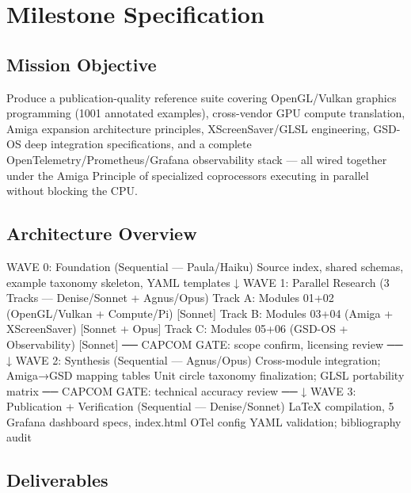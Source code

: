 \documentclass[11pt,letterpaper]{article}
\newcommand{\stageheader}[2]{%
  \noindent\colorbox{#2}{\makebox[\textwidth][l]{%
    \textcolor{white}{\bfseries\sffamily\hspace{6pt}#1\hspace{6pt}}}}%
  \vspace{0.5em}\par%
}
\begin{document}
\newpage


\stageheader{STAGE 3 --- MISSION PACKAGE}{tertiary}

\section{Milestone Specification}

\subsection{Mission Objective}

Produce a publication-quality reference suite covering OpenGL/Vulkan graphics programming (1001 annotated examples), cross-vendor GPU compute translation, Amiga expansion architecture principles, XScreenSaver/GLSL engineering, GSD-OS deep integration specifications, and a complete OpenTelemetry/Prometheus/Grafana observability stack — all wired together under the Amiga Principle of specialized coprocessors executing in parallel without blocking the CPU.

\subsection{Architecture Overview}

\begin{asciibox}
WAVE 0: Foundation (Sequential — Paula/Haiku)
  Source index, shared schemas, example taxonomy skeleton, YAML templates
  ↓
WAVE 1: Parallel Research (3 Tracks — Denise/Sonnet + Agnus/Opus)
  Track A: Modules 01+02 (OpenGL/Vulkan + Compute/Pi)     [Sonnet]
  Track B: Modules 03+04 (Amiga + XScreenSaver)           [Sonnet + Opus]
  Track C: Modules 05+06 (GSD-OS + Observability)         [Sonnet]
  ── CAPCOM GATE: scope confirm, licensing review ──
  ↓
WAVE 2: Synthesis (Sequential — Agnus/Opus)
  Cross-module integration; Amiga→GSD mapping tables
  Unit circle taxonomy finalization; GLSL portability matrix
  ── CAPCOM GATE: technical accuracy review ──
  ↓
WAVE 3: Publication + Verification (Sequential — Denise/Sonnet)
  LaTeX compilation, 5 Grafana dashboard specs, index.html
  OTel config YAML validation; bibliography audit
\end{asciibox}

\subsection{Deliverables}
\end{document}
